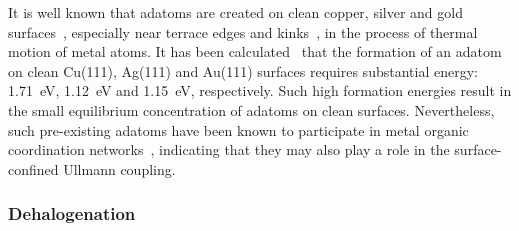 \documentclass[aps,prb,amsmath,amssymb,11pt]{revtex4-1}
\begin{document}

It is well known that adatoms are created on clean copper, silver and gold surfaces~\cite{ullmann_79, ullmann_58}, especially near terrace edges and kinks~\cite{ullmann_84, ullmann_85}, in the process of thermal motion of metal atoms. 
It has been calculated~\cite{chemeurope2017} that the formation of an adatom on clean Cu(111), Ag(111) and Au(111) surfaces requires substantial energy: \SI{1.71}{\electronvolt}, \SI{1.12}{\electronvolt} and \SI{1.15}{\electronvolt}, respectively. Such high formation energies result in the small equilibrium concentration of adatoms on clean surfaces.  
Nevertheless, such pre-existing adatoms have been known to participate in metal organic coordination networks~\cite{ullmann_80, ullmann_81, ullmann_82, ullmann_83}, indicating that they may also play a role in the surface-confined Ullmann coupling.


\ifdefined\INTERNAL

\subsubsection{Dehalogenation}
\end{document}
